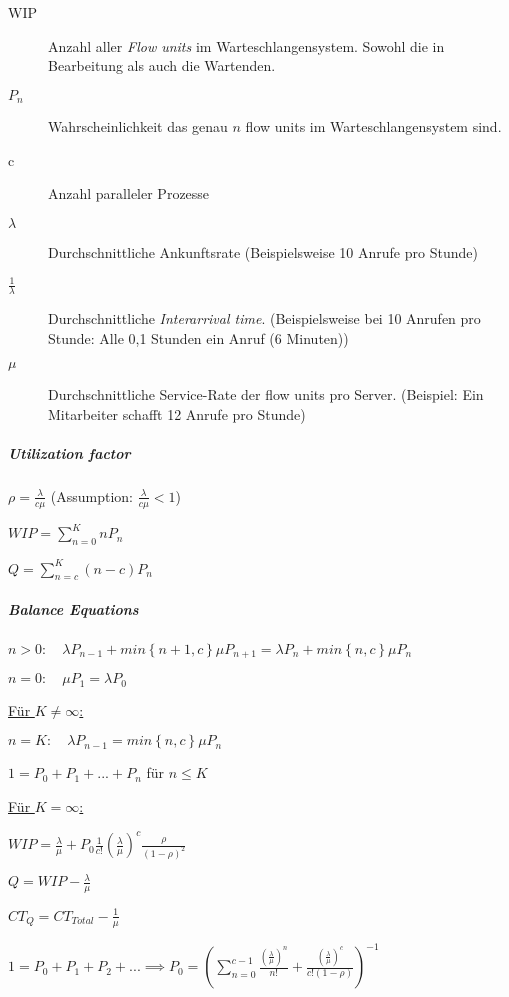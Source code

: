 \documentclass[a4paper,12pt,smallheadings]{scrartcl}
\begin{document}
\begin{description}
\item[WIP] Anzahl aller \textit{Flow units} im Warteschlangensystem. Sowohl die in Bearbeitung als auch die Wartenden.
\item[$P_n$] Wahrscheinlichkeit das genau $n$ flow units im Warteschlangensystem sind.
\item[c] Anzahl paralleler Prozesse
\item[$\lambda$] Durchschnittliche Ankunftsrate (Beispielsweise 10 Anrufe pro Stunde)
\item[$\frac{1}{\lambda}$] Durchschnittliche \textit{Interarrival time}. (Beispielsweise bei 10 Anrufen pro Stunde: Alle 0,1 Stunden ein Anruf (6 Minuten))
\item[$\mu$] Durchschnittliche Service-Rate der flow units pro Server. (Beispiel: Ein Mitarbeiter schafft 12 Anrufe pro Stunde)
\end{description}


\subparagraph{Utilization factor} 
$\rho = \frac{\lambda}{c\mu}$ 
\quad (Assumption: $\frac{\lambda}{c\mu} < 1$)

$WIP = \sum_{n=0}^{K} n P_n$

$Q = \sum_{n=c}^{K} (n-c) P_n$

\subparagraph{Balance Equations} \hfill

$n > 0: \quad \lambda P_{n-1} + min\left\{n+1,c\right\}\mu P_{n+1} = \lambda P_n + min\left\{ n, c \right\} \mu P_n $

$n = 0: \quad \mu P_1 = \lambda P_0$

\hfill

\underline{Für $K \neq \infty$:}

$n = K: \quad \lambda P_{n-1} = min\left\{ n,c \right\} \mu P_{n} $

$ 1 = P_0 + P_1 + ... + P_n $  \quad für $ n \leq K$

\hfill

\underline{Für $K = \infty$:}

$WIP = \frac{\lambda}{\mu} + P_0 \frac{1}{c!} \left(\frac{\lambda}{\mu}\right)^c \frac{\rho}{\left(1-\rho\right)^2}$

$Q = WIP - \frac{\lambda}{\mu}$

$CT_Q = CT_{Total} - \frac{1}{\mu}$

$1 = P_0 + P_1 + P_2 +... \implies P_0 = \left( \sum_{n=0}^{c-1} \frac{\left(\frac{\lambda}{\mu}\right)^n}{n!} +
\frac{ \left(\frac{\lambda}{\mu}\right)^c}{c! \left(1-\rho\right)} \right)^{-1}$
\end{document}
